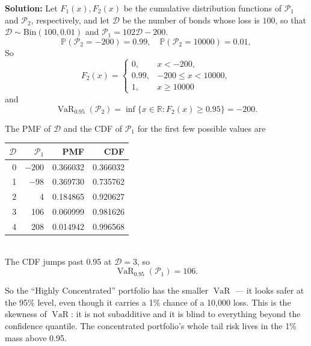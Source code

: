 \documentclass{MFM-hw} %
\newcommand{\VaR}{\operatorname{VaR}}
\newcommand{\real}{\mathbb{R}}
\renewcommand{\P}{\mathbb{P}}
\begin{document}
\textbf{Solution: }Let $F_1(x), F_2(x)$ be the cumulative distribution functions of $\mathcal{P}_1$ and $\mathcal{P}_2$, respectively, and let $\mathcal{D}$ be the number of bonds whose loss is $100$, so that $\mathcal{D} \sim \mathrm{Bin}(100, 0.01)$ and $\mathcal{P}_1 = 102\mathcal{D} - 200$.
\[
    \P(\mathcal{P}_2 = -200) = 0.99, \quad \P(\mathcal{P}_2 = 10000) = 0.01,
\]
So
\[
    F_2(x) = \begin{cases}
        0, &x<-200, \\
        0.99, &-200 \le x < 10000,\\
        1, & x \ge 10000
    \end{cases}
\]
and
\[
    \VaR_{0.95}(\mathcal{P}_2) = \inf \{x\in \real: F_2(x) \ge 0.95\} = -200.
\]

The PMF of $\mathcal{D}$ and the CDF of $\mathcal{P}_1$ for the first few possible values are
\begin{table}[h]
    \centering
    \renewcommand{\arraystretch}{1.5} %
    \setlength{\tabcolsep}{20pt}     %
    \begin{tabular}{r r r r}
        \hline
        $\mathcal{D}$ & $\mathcal{P}_1$ & PMF & CDF \\
        \hline
        0 & $-200$ & 0.366032 & 0.366032 \\
        1 & $-98$  & 0.369730 & 0.735762 \\
        2 & 4   & 0.184865 & 0.920627 \\
        3 & 106 & 0.060999 & 0.981626 \\
        4 & 208 & 0.014942 & 0.996568 \\
        \hline
    \end{tabular}
\end{table}
\\The CDF jumps past 0.95 at $\mathcal{D}= 3$, so 
\[
    \VaR_{0.95}(\mathcal{P}_1) = 106.
\]

So the ``Highly Concentrated'' portfolio has the smaller $\VaR$ — it looks safer at the 95\% level, even though it carries a 1\% chance of a 10,000 loss. This is the skewness of $\VaR$: it is not subadditive and it is blind to everything beyond the confidence quantile. The concentrated portfolio's whole tail risk lives in the 1\% mass above 0.95.
\end{document}

